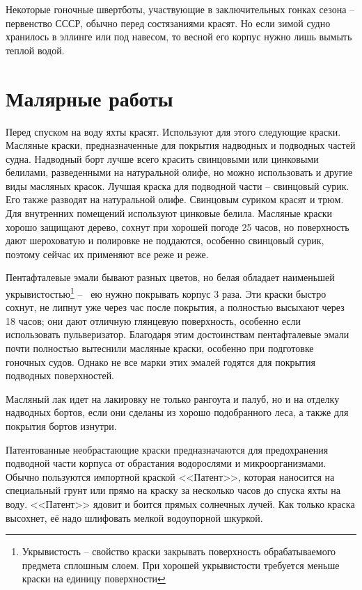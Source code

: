 \documentclass[a4paper, 12pt, twoside, final]{scrbook}
\begin{document}
Некоторые гоночные швертботы, участвующие в заключительных гонках сезона \--- первенство СССР, обычно перед состязаниями красят. Но если зимой судно хранилось в эллинге или под навесом, то весной его корпус нужно лишь вымыть теплой водой.

\section{Малярные работы}

Перед спуском на воду яхты красят. Используют для этого следующие краски.
Масляные краски, предназначенные для покрытия надводных и подводных частей судна. Надводный борт лучше всего красить свинцовыми или цинковыми белилами, разведенными на натуральной олифе, но можно использовать и другие виды масляных красок. Лучшая краска для подводной части \--- свинцовый сурик. Его также разводят на натуральной олифе. Свинцовым суриком красят и трюм. Для внутренних помещений используют цинковые белила. Масляные краски хорошо защищают дерево, сохнут при хорошей погоде 25 часов, но поверхность дают шероховатую и полировке не поддаются, особенно свинцовый сурик, поэтому сейчас их применяют все реже и реже.

Пентафталевые эмали бывают разных цветов, но белая обладает наименьшей укрывистостью\footnote{Укрывистость \--- свойство краски закрывать поверхность обрабатываемого предмета сплошным слоем. При хорошей укрывистости требуется меньше краски на единицу поверхности} \---~ ею нужно покрывать корпус 3 раза. Эти краски быстро сохнут, не липнут уже через час после покрытия, а полностью высыхают через 18 часов; они дают отличную глянцевую поверхность, особенно если использовать пульверизатор. Благодаря этим достоинствам пентафталевые эмали почти полностью вытеснили масляные краски, особенно при подготовке гоночных судов. Однако не все марки этих эмалей годятся для покрытия подводных поверхностей.

Масляный лак идет на лакировку не только рангоута и палуб, но и на отделку надводных бортов, если они сделаны из хорошо подобранного леса, а также для покрытия бортов изнутри.

Патентованные необрастающие краски предназначаются для предохранения подводной части корпуса от обрастания водорослями и микроорганизмами. Обычно пользуются импортной краской <<Патент>>, которая наносится на специальный грунт или прямо на краску за несколько часов до спуска яхты на воду. <<Патент>> ядовит и боится прямых солнечных лучей. Как только краска высохнет, её надо шлифовать мелкой водоупорной шкуркой.
\end{document}

